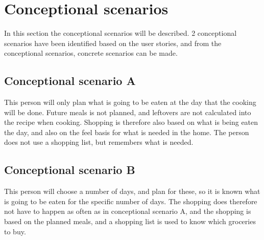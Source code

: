 \section{Conceptional scenarios}

In this section the conceptional scenarios will be described. 2 conceptional scenarios have been identified based on the user stories, and from the conceptional scenarios, concrete scenarios can be made.

\subsection{Conceptional scenario A} \label{ConceptionalScenarioA}
This person will only plan what is going to be eaten at the day that the cooking will be done. Future meals is not planned, and leftovers are not calculated into the recipe when cooking.
Shopping is therefore also based on what is being eaten the day, and also on the feel basis for what is needed in the home. The person does not use a shopping list, but remembers what is needed.

\subsection{Conceptional scenario B} \label{ConceptionalScenarioB}
This person will choose a number of days, and plan for these, so it is known what is going to be eaten for the specific number of days. The shopping does therefore not have to happen as often as in conceptional scenario A, and the shopping is based on the planned meals, and a shopping list is used to know which groceries to buy. 